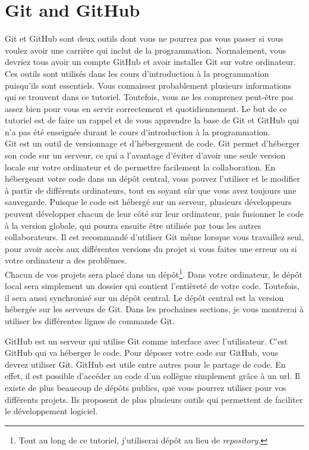 \documentclass{book}
\begin{document}
\setlength{\parindent}{0cm}
\chapter{Git and GitHub}

Git et GitHub sont deux outils dont vous ne pourrez pas vous passer si vous voulez avoir une carrière qui inclut de la programmation. Normalement, vous devriez tous avoir un compte GitHub et avoir installer Git sur votre ordinateur. Ces outils sont utilisés dans les cours d'introduction à la programmation puisqu'ils sont essentiels. Vous connaissez probablement plusieurs informations qui se trouvent dans ce tutoriel. Toutefois, vous ne les comprenez peut-être pas assez bien pour vous en servir correctement et quotidiennement. Le but de ce tutoriel est de faire un rappel et de vous apprendre la base de Git et GitHub qui n'a pas été enseignée durant le cours d'introduction à la programmation. \\

Git est un outil de versionnage et d'hébergement de code. Git permet d'héberger son code sur un serveur, ce qui a l'avantage d'éviter d'avoir une seule version locale sur votre ordinateur et de permettre facilement la collaboration. En hébergeant votre code dans un dépôt central, vous pouvez l'utiliser et le modifier à partir de différents ordinateurs, tout en soyant sûr que vous avez toujours une sauvegarde. Puisque le code est hébergé sur un serveur, plusieurs développeurs peuvent développer chacun de leur côté sur leur ordinateur, puis fusionner le code à la version globale, qui pourra ensuite être utilisée par tous les autres collaborateurs. Il est recommandé d'utiliser Git même lorsque vous travaillez seul, pour avoir accès aux différentes versions du projet si vous faites une erreur ou si votre ordinateur a des problèmes. \\

Chacun de vos projets sera placé dans un dépôt\footnote{Tout au long de ce tutoriel, j'utiliserai dépôt au lieu de \emph{repository}.}. Dans votre ordinateur, le dépôt local sera simplement un dossier qui contient l'entièreté de votre code. Toutefois, il sera aussi synchronisé sur un dépôt central. Le dépôt central est la version hébergée sur les serveurs de Git. Dans les prochaines sections, je vous montrerai à utiliser les différentes lignes de commande Git. 

GitHub est un serveur qui utilise Git comme interface avec l'utilisateur. C'est GitHub qui va héberger le code. Pour déposer votre code sur GitHub, vous devrez utiliser Git. GitHub est utile entre autres pour le partage de code. En effet, il est possible d'accéder au code d'un collègue simplement grâce à un url. Il existe de plus beaucoup de dépôts publics, que vous pourrez utiliser pour vos différents projets. Ils proposent de plus plusieurs outils qui permettent de faciliter le développement logiciel. 
\end{document}
